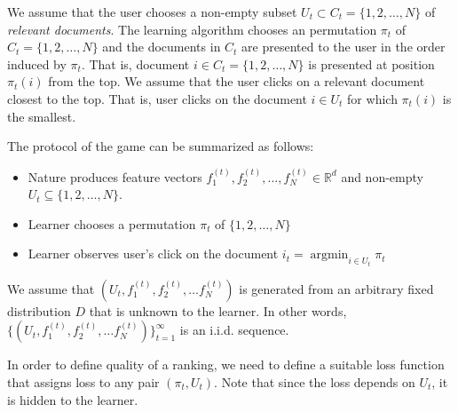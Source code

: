\documentclass{article}
\newcommand{\R}{\mathbb{R}}
\DeclareMathOperator*{\argmin}{argmin}
\begin{document}
We assume that the user chooses a non-empty subset $U_t
\subset C_t = \{1,2,\dots,N\}$ of \emph{relevant documents}. The learning
algorithm chooses an permutation $\pi_t$ of $C_t = \{1,2,\dots,N\}$ and the
documents in $C_t$ are presented to the user in the order induced by $\pi_t$.
That is, document $i \in C_t = \{1,2,\dots,N\}$ is presented at position
$\pi_t(i)$ from the top. We assume that the user clicks on a relevant document
closest to the top. That is, user clicks on the document $i \in U_t$ for which
$\pi_t(i)$ is the smallest.

The protocol of the game can be summarized as follows:

\begin{itemize}
\item Nature produces feature vectors
$f^{(t)}_1, f^{(t)}_2, \dots, f^{(t)}_N \in \R^d$
and non-empty $U_t \subseteq \{1,2,\dots,N\}$.
\item Learner chooses a permutation $\pi_t$ of $\{1,2,\dots,N\}$
\item Learner observes user's click on the document $i_t = \argmin_{i \in U_t} \pi_t$
\end{itemize}

We assume that $(U_t, f_1^{(t)}, f_2^{(t)}, \dots f_N^{(t)})$ is generated from
an arbitrary fixed distribution $D$ that is unknown to the learner.
In other words, $\{(U_t, f_1^{(t)}, f_2^{(t)}, \dots
f_N^{(t)})\}_{t=1}^\infty$ is an i.i.d. sequence.

In order to define quality of a ranking, we need to define a suitable loss
function that assigns loss to any pair $(\pi_t, U_t)$. Note that since the loss
depends on $U_t$, it is hidden to the learner.
\end{document}
